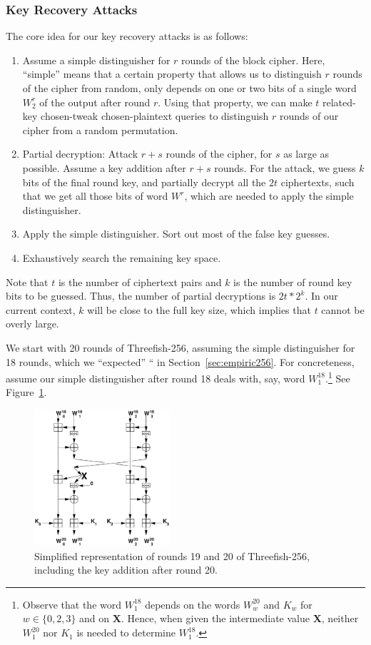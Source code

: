 \documentclass[11pt,twoside]{article}
\begin{document}
\subsubsection{Key Recovery Attacks}
  \label{sec:key-recovery}

The core idea for our key recovery attacks is as follows:
\begin{enumerate}
\item Assume a simple distinguisher for $r$ rounds of the block cipher.  Here, ``simple'' means that a certain property that allows us to distinguish $r$ rounds of the cipher from random, only depends on one or two bits of a single word $W^r_2$ of the output after round $r$. Using that property, we can make $t$ related-key chosen-tweak chosen-plaintext queries to distinguish $r$ rounds of our cipher from a random permutation.
 \item Partial decryption: Attack $r+s$ rounds of the cipher, for $s$ as large as possible. Assume a key addition after $r+s$ rounds. For the attack, we guess $k$ bits of the final round key, and partially decrypt all the $2t$ ciphertexts, such that we get all those bits of word $W^r$, which are needed to apply the simple distinguisher.
\item Apply the simple distinguisher. Sort out most of the false key guesses.
\item Exhaustively search the remaining key space.
\end{enumerate}

Note that $t$ is the number of ciphertext pairs and $k$ is the number of round key bits to be guessed. Thus, the number of partial decryptions is $2t*2^k$. In our current context, $k$ will be close to the full key size, which implies that $t$ cannot be overly large.

We start with 20 rounds of Threefish-256, assuming the simple distinguisher for 18 rounds, which we ``expected'' `` in Section~\ref{sec:empiric256}. For concreteness, assume our simple distinguisher after round 18 deals with, say, word $W^{18}_1$.\footnote{Observe that the word $W^{18}_1$ depends on the words $W^{20}_w$ and $K_w$ for $w\in \{0,2,3\}$ and on \textbf{X}. Hence, when given the intermediate value \textbf{X}, neither $W^{20}_1$ nor $K_1$ is needed to determine $W^{18}_1$.} See Figure~\ref{fig:key-recovery}.
%
\begin{figure}[htbp]
 \centering
  \includegraphics[width=0.45\textwidth]{key_recover.pdf}
 \caption{Simplified representation of rounds 19 and 20 of Threefish-256, including the key addition after round 20.}
 \label{fig:key-recovery}
\end{figure}
\end{document}
